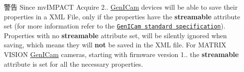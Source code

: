 \begin{DoxyWarning}{警告}
Since mv\+I\+M\+P\+A\+C\+T Acquire 2.. \hyperlink{namespacemv_i_m_p_a_c_t_1_1acquire_1_1_gen_i_cam}{Gen\+I\+Cam} devices will be able to save their properties in a X\+M\+L File, only if the properties have the {\bfseries streamable} attribute set (for more information refer to the \href{http://www.emva.org/standards-technology/genicam/genicam-downloads/}{\tt Gen\+I\+Cam standard specification}). Properties with no {\bfseries streamable} attribute set, will be silently ignored when saving, which means they will {\bfseries not} be saved in the X\+M\+L file. For M\+A\+T\+R\+I\+X V\+I\+S\+I\+O\+N \hyperlink{namespacemv_i_m_p_a_c_t_1_1acquire_1_1_gen_i_cam}{Gen\+I\+Cam} cameras, starting with firmware version 1.. the {\bfseries streamable} attribute is set for all the necessary properties.
\end{DoxyWarning}
~\newline


